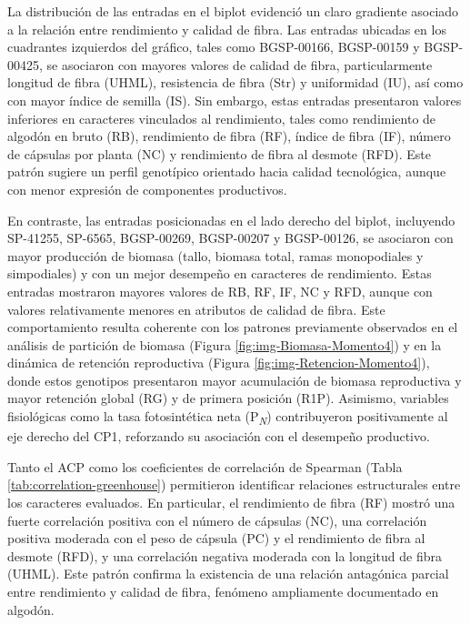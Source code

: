 \documentclass[12pt,oneside]{reedthesis}
\begin{document}
La distribución de las entradas en el biplot evidenció un claro gradiente asociado a la relación entre rendimiento y calidad de fibra. Las entradas ubicadas en los cuadrantes izquierdos del gráfico, tales como BGSP-00166, BGSP-00159 y BGSP-00425, se asociaron con mayores valores de calidad de fibra, particularmente longitud de fibra (UHML), resistencia de fibra (Str) y uniformidad (IU), así como con mayor índice de semilla (IS). Sin embargo, estas entradas presentaron valores inferiores en caracteres vinculados al rendimiento, tales como rendimiento de algodón en bruto (RB), rendimiento de fibra (RF), índice de fibra (IF), número de cápsulas por planta (NC) y rendimiento de fibra al desmote (RFD). Este patrón sugiere un perfil genotípico orientado hacia calidad tecnológica, aunque con menor expresión de componentes productivos.

En contraste, las entradas posicionadas en el lado derecho del biplot, incluyendo SP-41255, SP-6565, BGSP-00269, BGSP-00207 y BGSP-00126, se asociaron con mayor producción de biomasa (tallo, biomasa total, ramas monopodiales y simpodiales) y con un mejor desempeño en caracteres de rendimiento. Estas entradas mostraron mayores valores de RB, RF, IF, NC y RFD, aunque con valores relativamente menores en atributos de calidad de fibra. Este comportamiento resulta coherente con los patrones previamente observados en el análisis de partición de biomasa (Figura \ref{fig:img-Biomasa-Momento4}) y en la dinámica de retención reproductiva (Figura \ref{fig:img-Retencion-Momento4}), donde estos genotipos presentaron mayor acumulación de biomasa reproductiva y mayor retención global (RG) y de primera posición (R1P). Asimismo, variables fisiológicas como la tasa fotosintética neta (P\textsubscript{\emph{N}}) contribuyeron positivamente al eje derecho del CP1, reforzando su asociación con el desempeño productivo.

Tanto el ACP como los coeficientes de correlación de Spearman (Tabla \ref{tab:correlation-greenhouse}) permitieron identificar relaciones estructurales entre los caracteres evaluados. En particular, el rendimiento de fibra (RF) mostró una fuerte correlación positiva con el número de cápsulas (NC), una correlación positiva moderada con el peso de cápsula (PC) y el rendimiento de fibra al desmote (RFD), y una correlación negativa moderada con la longitud de fibra (UHML). Este patrón confirma la existencia de una relación antagónica parcial entre rendimiento y calidad de fibra, fenómeno ampliamente documentado en algodón.
\end{document}
